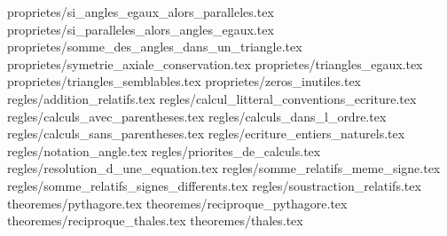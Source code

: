 \catalogues@enonce proprietes/si_angles_egaux_alors_paralleles.tex
\catalogues@enonce proprietes/si_paralleles_alors_angles_egaux.tex
\catalogues@enonce proprietes/somme_des_angles_dans_un_triangle.tex
\catalogues@enonce proprietes/symetrie_axiale_conservation.tex
\catalogues@enonce proprietes/triangles_egaux.tex
\catalogues@enonce proprietes/triangles_semblables.tex
\catalogues@enonce proprietes/zeros_inutiles.tex
\catalogues@enonce regles/addition_relatifs.tex
\catalogues@enonce regles/calcul_litteral_conventions_ecriture.tex
\catalogues@enonce regles/calculs_avec_parentheses.tex
\catalogues@enonce regles/calculs_dans_l_ordre.tex
\catalogues@enonce regles/calculs_sans_parentheses.tex
\catalogues@enonce regles/ecriture_entiers_naturels.tex
\catalogues@enonce regles/notation_angle.tex
\catalogues@enonce regles/priorites_de_calculs.tex
\catalogues@enonce regles/resolution_d_une_equation.tex
\catalogues@enonce regles/somme_relatifs_meme_signe.tex
\catalogues@enonce regles/somme_relatifs_signes_differents.tex
\catalogues@enonce regles/soustraction_relatifs.tex
\catalogues@enonce theoremes/pythagore.tex
\catalogues@enonce theoremes/reciproque_pythagore.tex
\catalogues@enonce theoremes/reciproque_thales.tex
\catalogues@enonce theoremes/thales.tex
